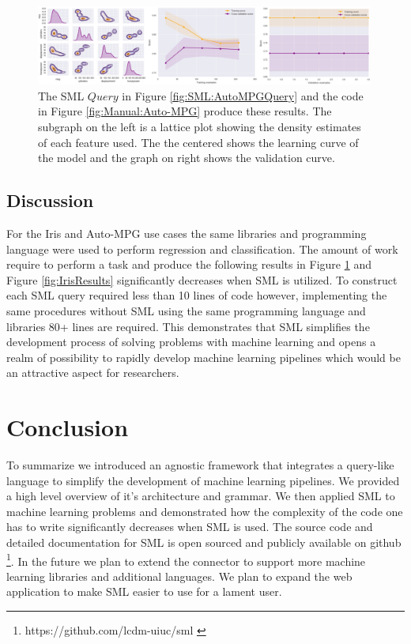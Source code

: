 \documentclass[jair,twoside,11pt,theapa]{article}
\begin{document}
\begin{figure}
\includegraphics[width=0.99\textwidth]{figs/auto-mpg-results.png}
\centering
\caption{The SML \(Query\) in Figure \ref{fig:SML:AutoMPGQuery}  and the code in Figure \ref{fig:Manual:Auto-MPG} produce these results. The subgraph on the left is a lattice plot showing the density estimates of each feature used. The the centered shows the learning curve of the model and the graph on right shows the validation curve.}
\label{fig:AutoMPG:Results}
\end{figure}

\subsection{Discussion}
For the Iris and Auto-MPG use cases the same libraries and programming language were used to perform regression and classification. The amount of work require to perform a task and produce the following results in Figure \ref{fig:AutoMPG:Results} and Figure \ref{fig:IrisResults} significantly decreases when SML is utilized. To construct each SML query required less than 10 lines of code however, implementing the same procedures without SML using the same programming language and libraries 80+ lines are required. This demonstrates that SML simplifies the development process of solving problems with machine learning and opens a realm of possibility to rapidly develop machine learning pipelines which would be an attractive aspect for researchers.

\section{Conclusion}
\label{conclusion}
To summarize we introduced an agnostic framework that integrates a query-like language to simplify the development of machine learning pipelines. We provided a high level overview of it's architecture and grammar. We then applied SML to machine learning problems and demonstrated how the complexity of the code one has to write significantly decreases when SML is used. The source code and detailed documentation for SML is open sourced and publicly available on github \footnote{https://github.com/lcdm-uiuc/sml \label{SML:Github}}. In the future we plan to extend the connector to support more machine learning libraries and additional languages. We plan to expand the web application to make SML easier to use for a lament user.
\end{document}
